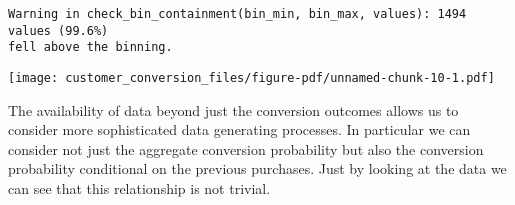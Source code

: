 \documentclass[
  letterpaper,
  DIV=11,
  numbers=noendperiod]{scrartcl}
\newenvironment{Shaded}{\begin{snugshade}}{\end{snugshade}}
\newcommand{\AttributeTok}[1]{\textcolor[rgb]{0.40,0.45,0.13}{#1}}
\newcommand{\ControlFlowTok}[1]{\textcolor[rgb]{0.00,0.23,0.31}{#1}}
\newcommand{\DecValTok}[1]{\textcolor[rgb]{0.68,0.00,0.00}{#1}}
\newcommand{\FunctionTok}[1]{\textcolor[rgb]{0.28,0.35,0.67}{#1}}
\newcommand{\NormalTok}[1]{\textcolor[rgb]{0.00,0.23,0.31}{#1}}
\newcommand{\OtherTok}[1]{\textcolor[rgb]{0.00,0.23,0.31}{#1}}
\newcommand{\SpecialCharTok}[1]{\textcolor[rgb]{0.37,0.37,0.37}{#1}}
\newcommand{\StringTok}[1]{\textcolor[rgb]{0.13,0.47,0.30}{#1}}
\begin{document}
\begin{verbatim}
Warning in check_bin_containment(bin_min, bin_max, values): 1494 values (99.6%)
fell above the binning.
\end{verbatim}

\texttt{[image: customer\_conversion\_files/figure-pdf/unnamed-chunk-10-1.pdf]}

The availability of data beyond just the conversion outcomes allows us
to consider more sophisticated data generating processes. In particular
we can consider not just the aggregate conversion probability but also
the conversion probability conditional on the previous purchases. Just
by looking at the data we can see that this relationship is not trivial.

\begin{Shaded}
\end{Shaded}
\end{document}
